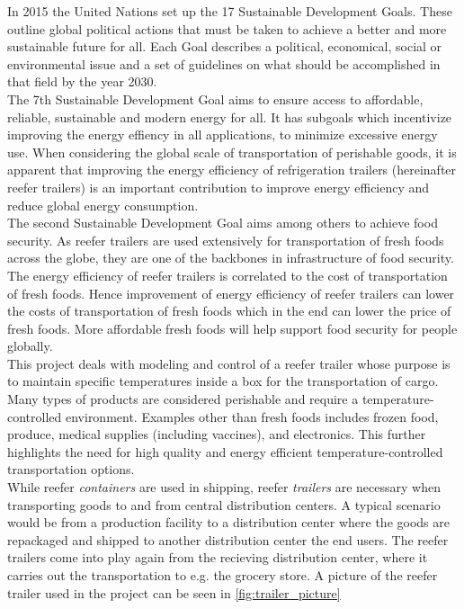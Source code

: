 In 2015 the United Nations set up the 17 Sustainable Development Goals. These outline global political actions that must be taken to achieve a better and more sustainable future for all. Each Goal describes a political, economical, social or environmental issue and a set of guidelines on what should be accomplished in that field by the year 2030.\\

The 7th Sustainable Development Goal\cite{UNdev_goal7} aims to ensure access to affordable, reliable, sustainable and modern energy for all. It has subgoals which incentivize improving the energy effiency in all applications, to minimize excessive energy use. When considering the global scale of transportation of perishable goods, it is apparent that improving the energy efficiency of refrigeration trailers (hereinafter reefer trailers) is an important contribution to improve energy efficiency and reduce global energy consumption. \\


The second Sustainable Development Goal \cite{UNdev_goal2} aims among others to achieve food security. As reefer trailers are used extensively for transportation of fresh foods across the globe, they are one of the backbones in infrastructure of food security. The energy efficiency of reefer trailers is correlated to the cost of transportation of fresh foods. Hence improvement of energy efficiency of reefer trailers can lower the costs of transportation of fresh foods which in the end can lower the price of fresh foods. More affordable fresh foods will help support food security for people globally.\\
   

This project deals with modeling and control of a reefer trailer whose purpose is to maintain specific temperatures inside a box for the transportation of cargo. Many types of products are considered perishable and require  a temperature-controlled environment. Examples other than fresh foods includes frozen food, produce, medical supplies (including vaccines), and electronics. This further highlights the need for high quality and energy efficient temperature-controlled transportation options. \\
While reefer \textit{containers} are used in shipping, reefer \textit{trailers} are necessary when transporting goods to and from central distribution centers. A typical scenario would be from a production facility to a distribution center where the goods are repackaged and shipped to another distribution center the end users. The reefer trailers come into play again from the recieving distribution center,  where it carries out the transportation to e.g. the grocery store. A picture of the reefer trailer used in the project can be seen in \cref{fig:trailer_picture}

